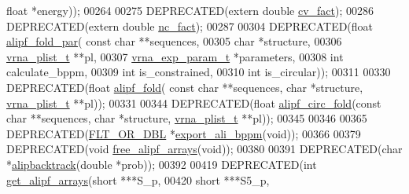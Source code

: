 \begin{DoxyCode}
{      float} *energy));
00264 
00275 DEPRECATED(\textcolor{keyword}{extern}  \textcolor{keywordtype}{double}  \hyperlink{group__consensus__fold_gaf3cbac6ff5d706d6e414677841ddf94c}{cv\_fact});
00286 DEPRECATED(\textcolor{keyword}{extern}  \textcolor{keywordtype}{double}  \hyperlink{group__consensus__fold_ga502948a122a2af5b914355b1f3ea2f61}{nc\_fact});
00287 
00304 DEPRECATED(\textcolor{keywordtype}{float} \hyperlink{group__consensus__pf__fold_ga5e8d54e41bf3d5b6e535d5bdb33c416e}{alipf\_fold\_par}( \textcolor{keyword}{const} \textcolor{keywordtype}{char} **sequences,
00305                       \textcolor{keywordtype}{char} *structure,
00306                       \hyperlink{group__data__structures_structvrna__plist__s}{vrna\_plist\_t} **pl,
00307                       \hyperlink{group__energy__parameters_structvrna__exp__param__s}{vrna\_exp\_param\_t} *parameters,
00308                       \textcolor{keywordtype}{int} calculate\_bppm,
00309                       \textcolor{keywordtype}{int} is\_constrained,
00310                       \textcolor{keywordtype}{int} is\_circular));
00311 
00330 DEPRECATED(\textcolor{keywordtype}{float} \hyperlink{group__consensus__pf__fold_gaa150d3ba7b009a1c27cb6f0eb197f6b4}{alipf\_fold}( \textcolor{keyword}{const} \textcolor{keywordtype}{char} **sequences, \textcolor{keywordtype}{char} *structure, 
      \hyperlink{group__data__structures_structvrna__plist__s}{vrna\_plist\_t} **pl));
00331 
00344 DEPRECATED(\textcolor{keywordtype}{float} \hyperlink{group__consensus__pf__fold_gaadd8d570442f86cbbc4978c8c62c9646}{alipf\_circ\_fold}(\textcolor{keyword}{const} \textcolor{keywordtype}{char} **sequences, \textcolor{keywordtype}{char} *structure, 
      \hyperlink{group__data__structures_structvrna__plist__s}{vrna\_plist\_t} **pl));
00345 
00346 
00365 DEPRECATED(\hyperlink{group__data__structures_ga31125aeace516926bf7f251f759b6126}{FLT\_OR\_DBL} *\hyperlink{group__consensus__pf__fold_ga11b6ab8bd9be1821fea352b190a01cab}{export\_ali\_bppm}(\textcolor{keywordtype}{void}));
00366 
00379 DEPRECATED(\textcolor{keywordtype}{void}  \hyperlink{group__consensus__pf__fold_ga0c0498f35686e26b38ee460d3db1a661}{free\_alipf\_arrays}(\textcolor{keywordtype}{void}));
00380 
00391 DEPRECATED(\textcolor{keywordtype}{char}  *\hyperlink{group__consensus__stochbt_ga0df40248788f0fb17ebdc59d74116d1c}{alipbacktrack}(\textcolor{keywordtype}{double} *prob));
00392 
00419 DEPRECATED(\textcolor{keywordtype}{int} \hyperlink{group__consensus__fold_ga5349960075b1847720a2e9df021e2675}{get\_alipf\_arrays}(\textcolor{keywordtype}{short} ***S\_p,
00420                      \textcolor{keywordtype}{short} ***S5\_p,

\end{DoxyCode}
